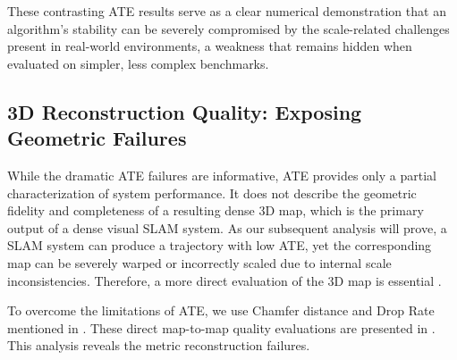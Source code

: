 These contrasting ATE results serve as a clear numerical demonstration that an algorithm's stability can be severely compromised by the scale-related challenges present in real-world environments, a weakness that remains hidden when evaluated on simpler, less complex benchmarks.

% 

% 

% 

% 

% 

% 

% 

% 

% 

% 

% 
\subsection{3D Reconstruction Quality: Exposing Geometric Failures}
\label{sec:exp_map}

While the dramatic \ac{ATE} failures are informative, \ac{ATE} provides only a partial characterization of system performance. It does not describe the geometric fidelity and completeness of a resulting dense 3D map, which is the primary output of a dense visual SLAM system. As our subsequent analysis will prove, a SLAM system can produce a trajectory with low ATE, yet the corresponding map can be severely warped or incorrectly scaled due to internal scale inconsistencies. Therefore, a more direct evaluation of the 3D map is essential \cite{hu2025mapeval}.

To overcome the limitations of ATE, we use Chamfer distance and Drop Rate mentioned in . These direct map-to-map quality evaluations are presented in . This analysis reveals the metric reconstruction failures.

